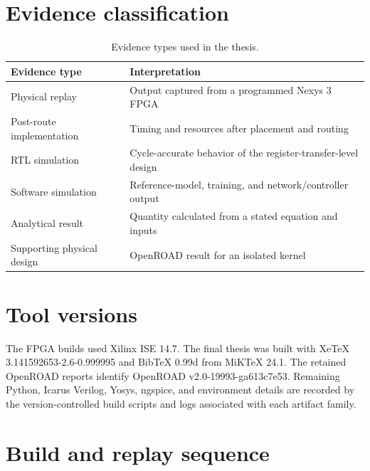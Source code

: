 \section{Evidence classification}

\begin{table}[H]
\centering
\caption{Evidence types used in the thesis.}
\label{tab:evidence-types}
\begin{tabularx}{\textwidth}{@{}p{}X@{}}
\toprule
\textbf{Evidence type} & \textbf{Interpretation}\\
\midrule
Physical replay & Output captured from a programmed Nexys 3 FPGA\\
Post-route implementation & Timing and resources after placement and routing\\
RTL simulation & Cycle-accurate behavior of the register-transfer-level design\\
Software simulation & Reference-model, training, and network/controller output\\
Analytical result & Quantity calculated from a stated equation and inputs\\
Supporting physical design & OpenROAD result for an isolated kernel\\
\bottomrule
\end{tabularx}
\end{table}

\section{Tool versions}

The FPGA builds used Xilinx ISE 14.7. The final thesis was built with XeTeX
3.141592653-2.6-0.999995 and BibTeX 0.99d from MiKTeX 24.1. The retained OpenROAD
reports identify OpenROAD v2.0-19993-ga613c7e53. Remaining Python, Icarus Verilog,
Yosys, ngspice, and environment details are recorded by the version-controlled build
scripts and logs associated with each artifact family.

\section{Build and replay sequence}

